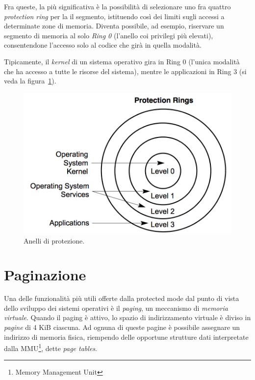 \documentclass[12pt,a4paper]{report}
\begin{document}
			Fra queste, la più significativa è la possibilità di selezionare uno fra quattro \emph{protection ring} per la
			il segmento, istituendo così dei limiti sugli accessi a determinate zone di memoria.
			Diventa possibile, ad esempio, riservare un segmento di memoria al solo \emph{Ring 0} (l'anello coi privilegi più elevati),
			consentendone l'accesso solo al codice che girà in quella modalità.
			
			Tipicamente, il \emph{kernel} di un sistema operativo gira in Ring 0 (l'unica modalità che ha accesso
			a tutte le risorse del sistema), mentre le applicazioni in Ring 3 (si veda la figura~\ref{fig:ring}).
			
			\begin{figure}[htbp]
			\centering
			\includegraphics[scale=0.5]{img/ring.png}
			\caption{Anelli di protezione. \cite{Intel}\label{fig:ring}}
			\end{figure}
			
	\section{Paginazione}
		Una delle funzionalità più utili offerte dalla protected mode dal punto di vista dello sviluppo dei sistemi operativi
		è il \emph{paging}, un meccanismo di \emph{memoria virtuale}.
		Quando il paging è attivo, lo spazio di indirizzamento virtuale è diviso in \emph{pagine} di 4 KiB ciascuna.
		Ad ognuna di queste pagine è possibile assegnare un indirizzo di memoria fisica, riempendo delle opportune
		strutture dati interpretate dalla MMU\footnote{Memory Management Unit}, dette \emph{page tables}.
		
\end{document}

